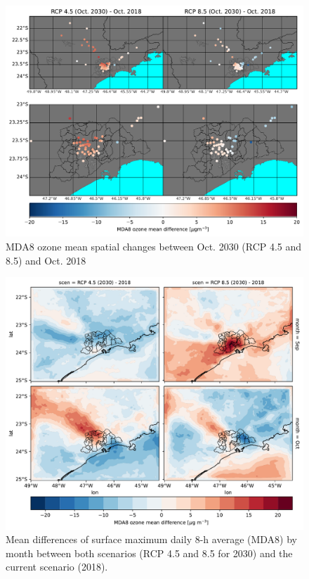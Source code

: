 \begin{figure}[hbt]
  \includegraphics[width=1\textwidth]{fig/mda8_spatial_station_oct}
  \caption{MDA8 ozone mean spatial changes between Oct. 2030 (RCP 4.5 and 8.5) and Oct. 2018}
  \label{fig:spatial_o3_oct}
\end{figure}


\begin{figure}[hbt]
\begin{center}
	\includegraphics[width=1\textwidth]{fig/map_mda8_diff.pdf}
\end{center}
  \caption{Mean differences of surface maximum daily 8-h average (MDA8) by month between both scenarios (RCP 4.5 and 8.5 for 2030) and the current scenario (2018).}
  \label{fig:spatial_diff_o3}
\end{figure}


   

